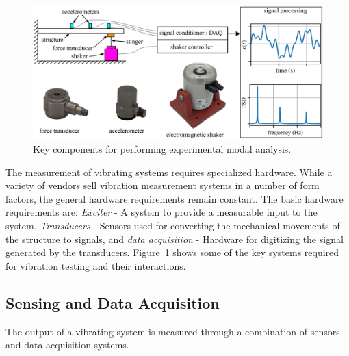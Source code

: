 \documentclass[12pt,letter]{article}
\begin{document}
\begin{vibration_case_study}
\end{vibration_case_study}
		
		
		\begin{figure}[H]
			\centering
			\includegraphics[]{../figures/vibration_testing.png}
			\caption{Key components for performing experimental modal analysis.}
			\label{fig:vibration_testing}
		\end{figure} 
		


The measurement of vibrating systems requires specialized hardware. While a variety of vendors sell vibration measurement systems in a number of form factors, the general hardware requirements remain constant. The basic hardware requirements are: \emph{Exciter} - A system to provide a measurable input to the system, \emph{Transducers} - Sensors used for converting the mechanical movements of the structure to signals, and \emph{data acquisition} - Hardware for digitizing the signal generated by the transducers. Figure~\ref{fig:vibration_testing} shows some of the key systems required for vibration testing and their interactions. 



\subsection{Sensing and Data Acquisition}

The output of a vibrating system is measured through a combination of sensors and data acquisition systems. 
\end{document}
